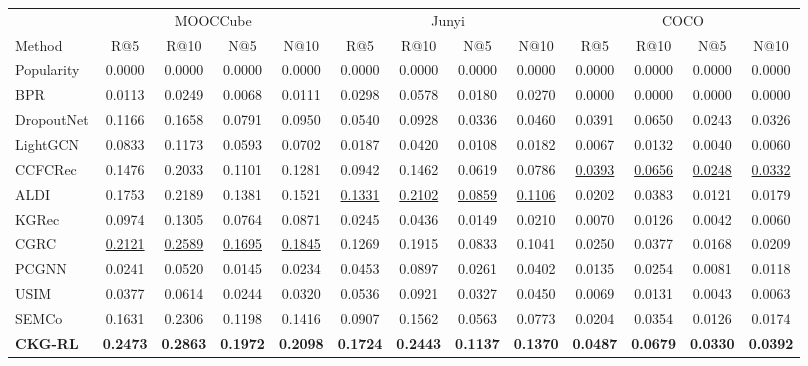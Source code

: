 \documentclass[letterpaper]{article}
\newcommand{\sigmark}[1]{\rlap{\textsuperscript{\scriptsize #1}}}
\begin{document}
\begin{table}[t]
\centering
{
\small
\setlength{\tabcolsep}{1.35pt}
\renewcommand{\arraystretch}{0.98}
\begin{tabular}{lcccccccccccc}
\toprule
& \multicolumn{4}{c}{MOOCCube} & \multicolumn{4}{c}{Junyi} & \multicolumn{4}{c}{COCO} \\
\cmidrule(lr){2-5}\cmidrule(lr){6-9}\cmidrule(lr){10-13}
Method & R@5 & R@10 & N@5 & N@10 & R@5 & R@10 & N@5 & N@10 & R@5 & R@10 & N@5 & N@10 \\
\midrule
Popularity & 0.0000 & 0.0000 & 0.0000 & 0.0000 & 0.0000 & 0.0000 & 0.0000 & 0.0000 & 0.0000 & 0.0000 & 0.0000 & 0.0000 \\
BPR & 0.0113 & 0.0249 & 0.0068 & 0.0111 & 0.0298 & 0.0578 & 0.0180 & 0.0270 & 0.0000 & 0.0000 & 0.0000 & 0.0000 \\
DropoutNet & 0.1166 & 0.1658 & 0.0791 & 0.0950 & 0.0540 & 0.0928 & 0.0336 & 0.0460 & 0.0391 & 0.0650 & 0.0243 & 0.0326 \\
LightGCN & 0.0833 & 0.1173 & 0.0593 & 0.0702 & 0.0187 & 0.0420 & 0.0108 & 0.0182 & 0.0067 & 0.0132 & 0.0040 & 0.0060 \\
CCFCRec & 0.1476 & 0.2033 & 0.1101 & 0.1281 & 0.0942 & 0.1462 & 0.0619 & 0.0786 & \underline{0.0393} & \underline{0.0656} & \underline{0.0248} & \underline{0.0332} \\
ALDI & 0.1753 & 0.2189 & 0.1381 & 0.1521 & \underline{0.1331} & \underline{0.2102} & \underline{0.0859} & \underline{0.1106} & 0.0202 & 0.0383 & 0.0121 & 0.0179 \\
KGRec & 0.0974 & 0.1305 & 0.0764 & 0.0871 & 0.0245 & 0.0436 & 0.0149 & 0.0210 & 0.0070 & 0.0126 & 0.0042 & 0.0060 \\
CGRC & \underline{0.2121} & \underline{0.2589} & \underline{0.1695} & \underline{0.1845} & 0.1269 & 0.1915 & 0.0833 & 0.1041 & 0.0250 & 0.0377 & 0.0168 & 0.0209 \\
PCGNN & 0.0241 & 0.0520 & 0.0145 & 0.0234 & 0.0453 & 0.0897 & 0.0261 & 0.0402 & 0.0135 & 0.0254 & 0.0081 & 0.0118 \\
USIM & 0.0377 & 0.0614 & 0.0244 & 0.0320 & 0.0536 & 0.0921 & 0.0327 & 0.0450 & 0.0069 & 0.0131 & 0.0043 & 0.0063 \\
SEMCo & 0.1631 & 0.2306 & 0.1198 & 0.1416 & 0.0907 & 0.1562 & 0.0563 & 0.0773 & 0.0204 & 0.0354 & 0.0126 & 0.0174 \\
\midrule
\textbf{CKG-RL} & \textbf{0.2473}\sigmark{*} & \textbf{0.2863}\sigmark{*} & \textbf{0.1972}\sigmark{*} & \textbf{0.2098}\sigmark{*} & \textbf{0.1724}\sigmark{*} & \textbf{0.2443}\sigmark{*} & \textbf{0.1137}\sigmark{*} & \textbf{0.1370}\sigmark{*} & \textbf{0.0487}\sigmark{*} & \textbf{0.0679} & \textbf{0.0330}\sigmark{*} & \textbf{0.0392}\sigmark{*} \\

\end{tabular}}
\end{table}
\end{document}
